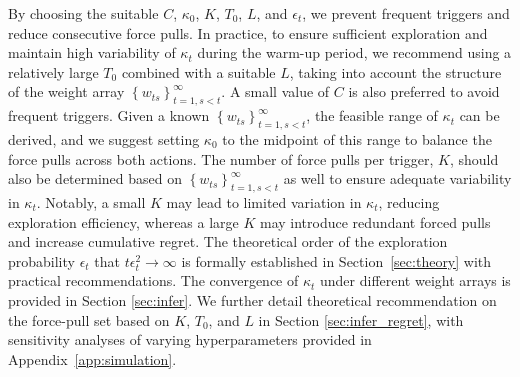 \documentclass[12pt]{article}
\begin{document}
By choosing the suitable \( C \), \( \kappa_0 \), \( K \), \( T_0 \), \( L \), and \( \epsilon_t \), we prevent frequent triggers and reduce consecutive force pulls. In practice, to ensure sufficient exploration and maintain high variability of $\kappa_t$ during the warm-up period, we recommend using a relatively large $T_0$ combined with a suitable $L$, taking into account the structure of the weight array $\left\{w_{ts}\right\}_{t=1,s<t}^\infty$. A small value of $C$ is also preferred to avoid frequent triggers.
Given a known $\left\{w_{ts}\right\}_{t=1,s<t}^\infty$, the feasible range of $\kappa_t$ can be derived, and we suggest setting $\kappa_0$ to the midpoint of this range to balance the force pulls across both actions. The number of force pulls per trigger, $K$, should also be determined based on $\left\{w_{ts}\right\}_{t=1,s<t}^\infty$ as well to ensure adequate variability in $\kappa_t$. Notably, a small $K$ may lead to limited variation in $\kappa_t$, reducing exploration efficiency, whereas a large $K$ may introduce redundant forced pulls and increase cumulative regret. 
The theoretical order of the exploration probability $\epsilon_t$ that $t\epsilon_t^2 \to \infty$ is formally established in Section~\ref{sec:theory} with practical recommendations. 
The convergence of $\kappa_t$ under different weight arrays is provided in Section \ref{sec:infer}. We further detail theoretical recommendation on the force-pull set based on \( K \), \( T_0 \), and \( L \) in Section \ref{sec:infer_regret},
with sensitivity analyses of varying hyperparameters provided in Appendix~\ref{app:simulation}.
\end{document}
